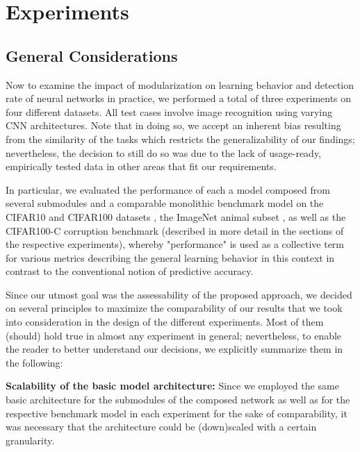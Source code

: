 \cleardoublepage

\section{Experiments%
         \label{sec:experiments}}
         
\subsection{General Considerations%
            \label{sec:experiments_general}}

Now to examine the impact of modularization on learning behavior and detection rate of neural networks in practice, we performed a total of three experiments on four different datasets. All test cases involve image recognition using varying CNN architectures. Note that in doing so, we accept an inherent bias resulting from the similarity of the tasks which restricts the generalizability of our findings; nevertheless, the decision to still do so was due to the lack of usage-ready, empirically tested data in other areas that fit our requirements.

In particular, we evaluated the performance of each a model composed from several submodules and a comparable monolithic benchmark model on the CIFAR10 and CIFAR100 datasets \cite{Krizhevsky2009-wt}, the ImageNet animal subset \cite{Deng2009-iz}, as well as the CIFAR100-C corruption benchmark \cite{Hendrycks2019-gi} (described in more detail in the sections of the respective experiments), whereby "performance" is used as a collective term for various metrics describing the general learning behavior in this context in contrast to the conventional notion of predictive accuracy.

Since our utmost goal was the assessability of the proposed approach, we decided on several principles to maximize the comparability of our results that we took into consideration in the design of the different experiments. Most of them (should) hold true in almost any experiment in general; nevertheless, to enable the reader to better understand our decisions, we explicitly summarize them in the following:

\textbf{Scalability of the basic model architecture:} Since we employed the same basic architecture for the submodules of the composed network as well as for the respective benchmark model in each experiment for the sake of comparability, it was necessary that the architecture could be (down)scaled with a certain granularity.

